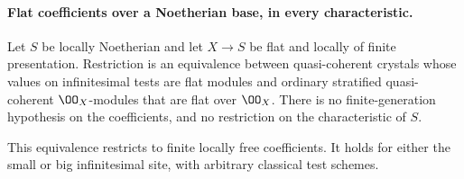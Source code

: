 \paragraph{Flat coefficients over a Noetherian base, in every characteristic.}

\begin{proposition}\label{prop:DE-E2-flat-Noetherian}
Let $S$ be locally Noetherian and let $X\to S$ be flat and locally of finite presentation.  Restriction is an equivalence between quasi-coherent crystals whose values on infinitesimal tests are flat modules and ordinary stratified quasi-coherent $\OO_X$-modules that are flat over $\OO_X$.  There is no finite-generation hypothesis on the coefficients, and no restriction on the characteristic of $S$.

This equivalence restricts to finite locally free coefficients.  It holds for either the small or big infinitesimal site, with arbitrary classical test schemes.
\end{proposition}
